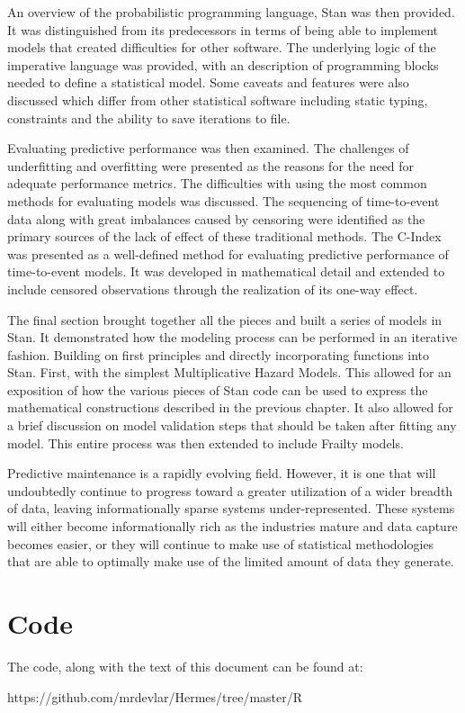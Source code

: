 An overview of the probabilistic programming language, Stan was then provided. It was distinguished from its predecessors in terms of being able to implement models that created difficulties for other software. The underlying logic of the imperative  language was provided, with an description of programming blocks needed to define a statistical model. Some caveats and features were also discussed which differ from other statistical software including static typing, constraints and the ability to save iterations to file.

Evaluating predictive performance was then examined. The challenges of underfitting and overfitting were presented as the reasons for the need for adequate performance metrics. The difficulties with using the most common methods for evaluating models was discussed. The sequencing of time-to-event data along with great imbalances caused by censoring were identified as the primary sources of the lack of effect of these traditional methods. The C-Index was presented as a well-defined method for evaluating predictive performance of time-to-event models. It was developed in mathematical detail and extended to include censored observations through the realization of its one-way effect.

The final section brought together all the pieces and built a series of models in Stan. It demonstrated how the modeling process can be performed in an iterative fashion. Building on first principles and directly incorporating functions into Stan. First, with the simplest Multiplicative Hazard Models. This allowed for an exposition of how the various pieces of Stan code can be used to express the mathematical constructions described in the previous chapter. It also allowed for a brief discussion on model validation steps that should be taken after fitting any model. This entire process was then extended to include Frailty models. 

Predictive maintenance is a rapidly evolving field. However, it is one that will undoubtedly continue to progress toward a greater utilization of a wider breadth of data, leaving informationally sparse systems under-represented. These systems will either become informationally rich as the industries mature and data capture becomes easier, or they will continue to make use of statistical methodologies that are able to optimally make use of the limited amount of data they generate.







\section*{Code}


The code, along with the text of this document can be found at:

https://github.com/mrdevlar/Hermes/tree/master/R

